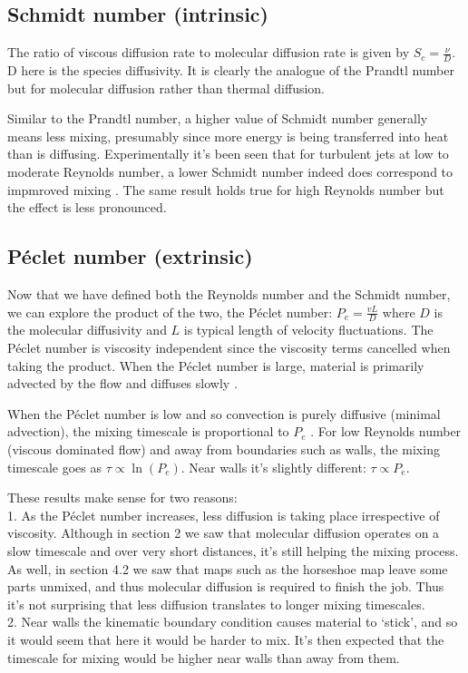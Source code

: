 \documentclass[a4paper,12pt]{article}
\begin{document}
\subsection{Schmidt number (intrinsic)}

The ratio of viscous diffusion rate to molecular diffusion rate is given by $S_c = \frac{\nu}{D}$. D here is the species diffusivity. It is clearly the analogue of the Prandtl number but for molecular diffusion rather than thermal diffusion. 

Similar to the Prandtl number, a higher value of Schmidt number generally means less mixing, presumably since more energy is being transferred into heat than is diffusing. Experimentally it's been seen that for turbulent jets at low to moderate Reynolds number, a lower Schmidt number indeed does correspond to impmroved mixing \citep{m91}. The same result holds true for high Reynolds number but the effect is less pronounced.
\subsection{P\'{e}clet number (extrinsic)}  

Now that we have defined both the Reynolds number and the Schmidt number, we can explore the product of the two, the Péclet number: $P_e = \frac{vL}{D}$ where $D$ is the molecular diffusivity and $L$ is typical length of velocity fluctuations. The Péclet number is viscosity independent since the viscosity terms cancelled when taking the product. When the P\'{e}clet number is large, material is primarily advected by the flow and diffuses slowly \citep[~p.52]{h99}. 

When the P\'{e}clet number is low and so convection is purely diffusive (minimal advection), the mixing timescale is proportional to $P_e$ \citep[~p.84]{k010}. For low Reynolds number (viscous dominated flow) and away from boundaries such as walls, the mixing timescale goes as $\tau \propto \ln(P_e)$. Near walls it's slightly different: $\tau \propto P_e$. 

These results make sense for two reasons:\\
1. As the P\'{e}clet number increases, less diffusion is taking place irrespective of viscosity. Although in section 2 we saw that molecular diffusion operates on a slow timescale and over very short distances, it's still helping the mixing process. As well, in section 4.2 we saw that maps such as the horseshoe map leave some parts unmixed, and thus molecular diffusion is required to finish the job. Thus it's not surprising that less diffusion translates to longer mixing timescales.\\
2. Near walls the kinematic boundary condition causes material to `stick', and so it would seem that here it would be harder to mix. It's then expected that the timescale for mixing would be higher near walls than away from them.
\end{document}
